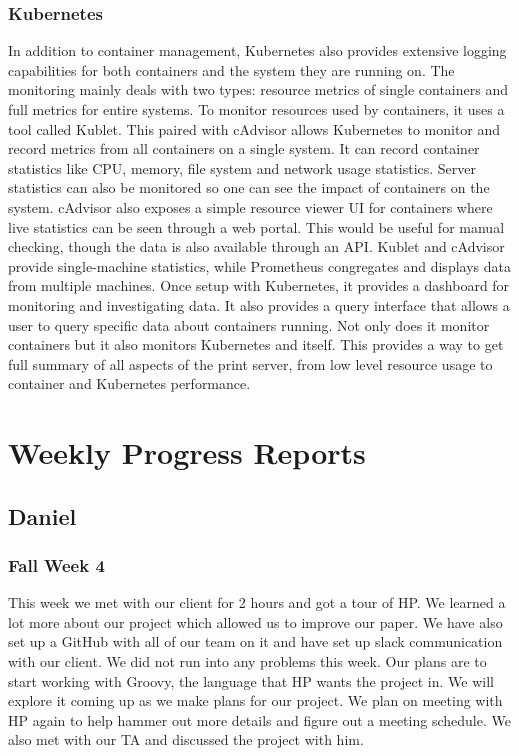 \documentclass[onecolumn, draftclsnofoot,10pt, compsoc]{IEEEtran}
\begin{document}
\subsubsection{Kubernetes}
In addition to container management, Kubernetes also provides extensive logging capabilities for both containers and the system they are running on.
The monitoring mainly deals with two types: resource metrics of single containers and full metrics for entire systems.
To monitor resources used by containers, it uses a tool called Kublet. This paired with cAdvisor allows Kubernetes to monitor and record metrics from all containers on a single system. 
It can record container statistics like CPU, memory, file system and network usage statistics.
Server statistics can also be monitored so one can see the impact of containers on the system. 
cAdvisor also exposes a simple resource viewer UI for containers where live statistics can be seen through a web portal.
This would be useful for manual checking, though the data is also available through an API.
Kublet and cAdvisor provide single-machine statistics, while Prometheus congregates and displays data from multiple machines.
Once setup with Kubernetes, it provides a dashboard for monitoring and investigating data.
It also provides a query interface that allows a user to query specific data about containers running.
Not only does it monitor containers but it also monitors Kubernetes and itself. This provides a way to get full summary of all aspects of the print server, from low level resource usage to container and Kubernetes performance.

\section{Weekly Progress Reports}
\subsection{Daniel}
\subsubsection*{Fall Week 4}
This week we met with our client for 2 hours and got a tour of HP. We learned a lot more about our project which allowed us to improve our paper. We have also set up a GitHub with all of our team on it and have set up slack communication with our client. We did not run into any problems this week. Our plans are to start working with Groovy, the language that HP wants the project in. We will explore it coming up as we make plans for our project. We plan on meeting with HP again to help hammer out more details and figure out a meeting schedule. We also met with our TA and discussed the project with him.
\end{document}
